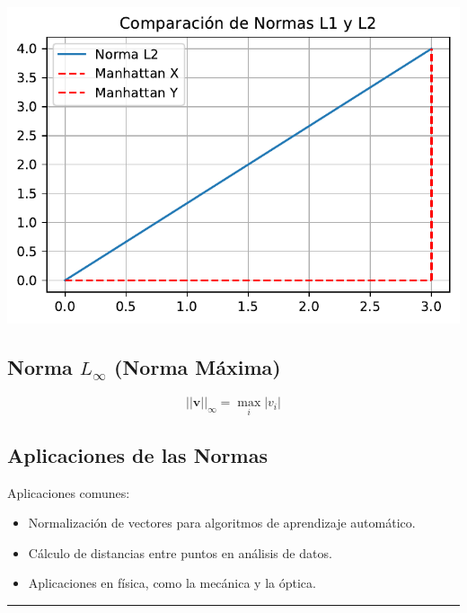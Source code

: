 \documentclass[
  letterpaper,
  DIV=11,
  numbers=noendperiod]{scrartcl}
\begin{document}
\includegraphics{presentacion_files/figure-pdf/cell-4-output-1.pdf}

\subsection{\texorpdfstring{Norma \(L_\infty\) (Norma
Máxima)}{Norma L\_\textbackslash infty (Norma Máxima)}}\label{norma-l_infty-norma-muxe1xima}

\[
||\mathbf{v}||_\infty = \max_i |v_i|
\]

\subsection{Aplicaciones de las
Normas}\label{aplicaciones-de-las-normas}

Aplicaciones comunes:

\begin{itemize}
\item
  Normalización de vectores para algoritmos de aprendizaje automático.
\item
  Cálculo de distancias entre puntos en análisis de datos.
\item
  Aplicaciones en física, como la mecánica y la óptica.
\end{itemize}

\begin{center}\rule{0.5\linewidth}{0.5pt}\end{center}
\end{document}
